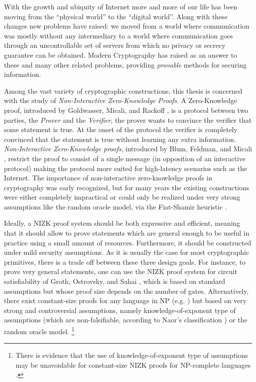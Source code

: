 With the growth and ubiquity of Internet more and more of our life has been moving from the ``physical world'' to the ``digital world''. Along with these changes new problems have raised: we moved from a world where communication was mostly without any intermediary to a world where communication goes through an uncontrollable set of servers from which no privacy or secrecy guarantee can be obtained. Modern Cryptography has raised as an answer to these and many other related problems, providing \emph{provable} methods for securing information.  

Among the vast variety of cryptographic constructions, this thesis is concerned with the study of \emph{Non-Interactive Zero-Knowledge Proofs}.
A Zero-Knowledge proof, introduced by Goldwasser, Micali, and Rackoff \cite{GolMicRac89}, is a protocol between two parties, the \emph{Prover} and the \emph{Verifier}, the prover wants to convince the verifier that some statement is true. At the onset of the protocol the verifier is completely convinced that the statement is true without learning any extra information. \emph{Non-Interactive Zero-Knowledge proofs}, introduced by Blum, Feldman, and Micali \cite{STOC:BluFelMic88}, restrict the proof to consist of a single message (in opposition of an interactive protocol) making the protocol more suited for high-latency scenarios such as the Internet.
The importance of non-interactive zero-knowledge proofs in cryptography was early recognized, but for many years the existing constructions were either completely impractical or could only be realized under very strong assumptions like the random oracle model, via the Fiat-Shamir heuristic \cite{C:FiaSha86}. 

Ideally, a NIZK proof system should be both expressive and efficient, meaning that it should allow to prove
statements which are general enough to be useful in practice using a small amount of resources.
Furthermore, it should be constructed under
mild security assumptions.
As it is usually the case for most cryptographic primitives, there is a trade off between these three design goals.
For instance,
to prove very general statements, one can use the NIZK proof 
system for circuit satisfiability of Groth, Ostrovsky, and Sahai 
\cite{EC:GroOstSah06}, which is based on standard assumptions but 
whose proof size depends on the number of gates. 
Alternatively,
there exist constant-size proofs for any language in NP
  (e.g. \cite{EC:GGPR13}) but based on very strong and controversial assumptions, 
  namely knowledge-of-exponent type of assumptions 
  (which are non-falsifiable, according to Naor's classification 
  \cite{C:Naor03}) or the random oracle model. 
\footnote{There is evidence that the use of knowledge-of-exponent type of  assumptions 
may be unavoidable for constant-size NIZK proofs for NP-complete languages \cite{STOC:GenWic11}.}

